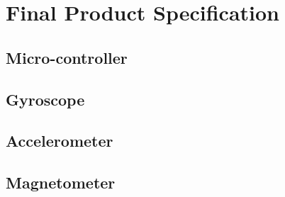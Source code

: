 \documentclass{report}
\begin{document}
\section{Final Product Specification}

\subsection{Micro-controller}

\subsection{Gyroscope}

\subsection{Accelerometer}

\subsection{Magnetometer}




 
\end{document}
